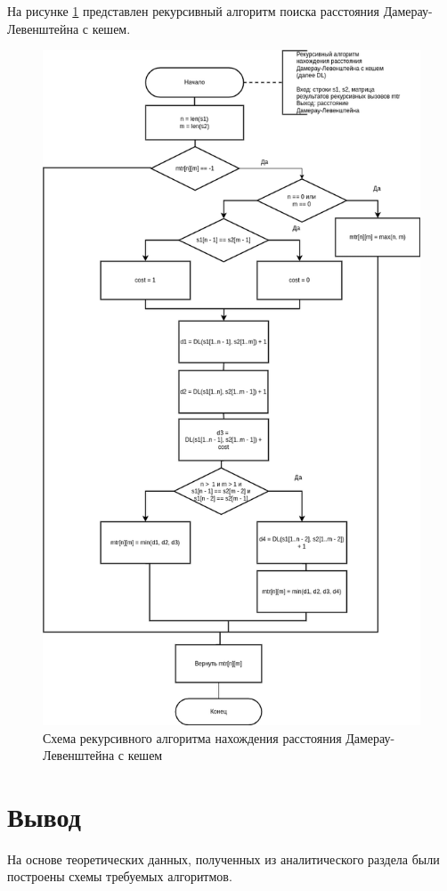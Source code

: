На рисунке \ref{img:dl_recursive_cache} представлен рекурсивный алгоритм поиска расстояния Дамерау-Левенштейна с кешем.

\begin{figure}[H]
	\begin{center}
		\includegraphics[scale=0.449]{img/dl_recursive_cache.png}
	\end{center}
	\captionsetup{justification=centering}
	\caption{Схема рекурсивного алгоритма нахождения расстояния Дамерау-Левенштейна с кешем}
	\label{img:dl_recursive_cache}
\end{figure}

\section*{Вывод}

На основе теоретических данных, полученных из аналитического раздела
были построены схемы требуемых алгоритмов.